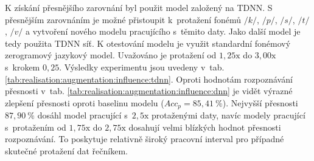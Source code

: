 


K získání přesnějšího zarovnání byl použit model založený na TDNN.
S přesnějším zarovnáním je možné přistoupit k~protažení fonémů $/k/$, $/p/$, $/s/$, $/t/$, $/v/$ a vytvoření nového modelu pracujícího s~těmito daty.
Jako další model je tedy použita TDNN síť.
K otestování modelu je využit standardní fonémový zerogramový jazykový model.
Uvažováno je protažení od $1,25\mathrm{x}$ do $3,00\mathrm{x}$ s~krokem $0,25$. Výsledky experimentu jsou uvedeny v~tab. \ref{tab:realisation:augmentation:influence:tdnn}.
Oproti hodnotám rozpoznávání přesnosti v~tab. \ref{tab:realisation:augmentation:influence:dnn} je vidět výrazné zlepšení přesnosti oproti baselinu modelu ($Acc_{p} = 85,41~\%$).
Nejvyšší přesnosti $87,90~\%$ dosáhl model pracující s~$2,5\mathrm{x}$ protaženými daty, navíc modely pracující s~protažením od $1,75\mathrm{x}$ do $2,75\mathrm{x}$ dosahují velmi blízkých hodnot přesnosti rozpoznávání.
To poskytuje relativně široký pracovní interval pro případné skutečné protažení dat řečníkem.

